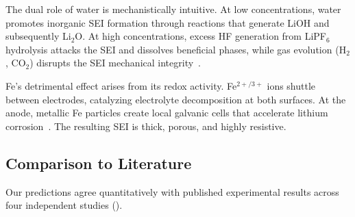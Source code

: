 The dual role of water is mechanistically intuitive. At low concentrations, water promotes inorganic SEI formation through reactions that generate LiOH and subsequently Li$_2$O. At high concentrations, excess HF generation from LiPF$_6$ hydrolysis attacks the SEI and dissolves beneficial phases, while gas evolution (H$_2$, CO$_2$) disrupts the SEI mechanical integrity~\citep{baakes2023impact}.

Fe's detrimental effect arises from its redox activity. Fe$^{2+/3+}$ ions shuttle between electrodes, catalyzing electrolyte decomposition at both surfaces. At the anode, metallic Fe particles create local galvanic cells that accelerate lithium corrosion~\citep{fink2021metallic}. The resulting SEI is thick, porous, and highly resistive.

\subsection{Comparison to Literature}
\label{sec:comparison}

Our predictions agree quantitatively with published experimental results across four independent studies ().

\begin{table}[t]
    \centering
    \caption{Comparison of our computational predictions with published experimental findings. Agreement is assessed qualitatively.}
    \label{tab:comparison}
\end{table}

